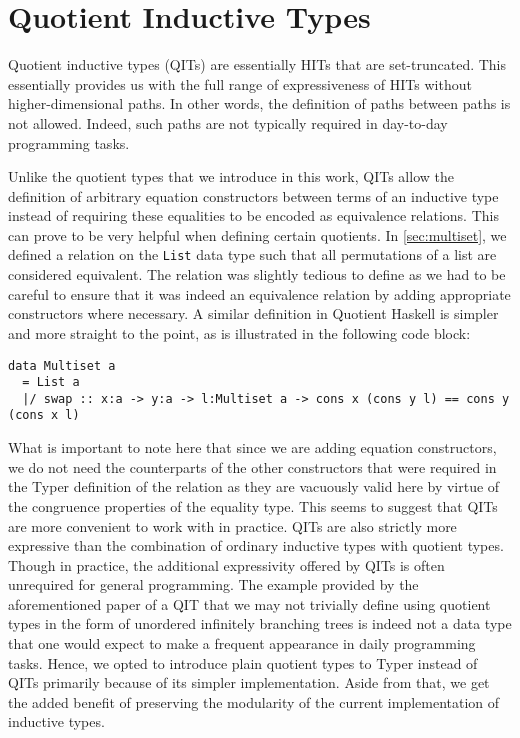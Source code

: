 \documentclass[12pt,twoside,maitrise]{dms}
\theoremstyle{definition}
\numberwithin{equation}{section}
\numberwithin{table}{chapter}
\numberwithin{figure}{chapter}
\newcommand\id[1] {\texttt{#1}}
\begin{document}
\section{Quotient Inductive Types}\label{sec:related-qit}

Quotient inductive types (QITs) are essentially HITs that are set-truncated.
This essentially provides us with the full range of expressiveness of HITs
without higher-dimensional paths. In other words, the definition of paths
between paths is not allowed. Indeed, such paths are not typically required in
day-to-day programming tasks.

Unlike the quotient types that we introduce in this work, QITs allow the
definition of arbitrary equation constructors between terms of an inductive type
instead of requiring these equalities to be encoded as equivalence relations.
This can prove to be very helpful when defining certain quotients. In
\autoref{sec:multiset}, we defined a relation on the \id{List} data type such
that all permutations of a list are considered equivalent. The relation was
slightly tedious to define as we had to be careful to ensure that it was indeed
an equivalence relation by adding appropriate constructors where necessary. A similar
definition in Quotient Haskell\cite{hewer2023quotient} is simpler and more straight
to the point, as is illustrated in the following code block:

\begin{verbatim}
data Multiset a
  = List a
  |/ swap :: x:a -> y:a -> l:Multiset a -> cons x (cons y l) == cons y (cons x l)
\end{verbatim}

What is important to note here that since we are adding equation constructors,
we do not need the counterparts of the other constructors that were required in
the Typer definition of the relation as they are vacuously valid here by virtue
of the congruence properties of the equality type. This seems to suggest that
QITs are more convenient to work with in practice. QITs are also strictly more
expressive than the combination of ordinary inductive types with quotient
types\cite{fiore2022quotients}. Though in practice, the additional expressivity
offered by QITs is often unrequired for general programming. The example
provided by the aforementioned paper of a QIT that we may not trivially define
using quotient types in the form of unordered infinitely branching trees is
indeed not a data type that one would expect to make a frequent appearance in
daily programming tasks. Hence, we opted to introduce plain quotient types to
Typer instead of QITs primarily because of its simpler implementation. Aside
from that, we get the added benefit of preserving the modularity of the current
implementation of inductive types.
\end{document}
